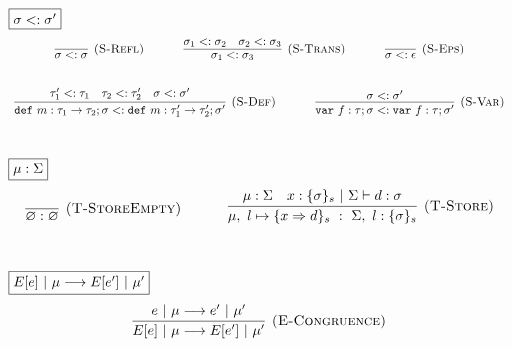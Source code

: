 \documentclass{llncs}
\newcommand{\keywadj}[1]{\mathtt{#1}}
\newcommand{\keyw}[1]{\keywadj{#1}~}
\begin{document}
$\fbox{$\sigma <: \sigma'$}$
\[
\begin{array}{c}
\infer[\textsc{(S-Refl)}]
  {\sigma <: \sigma}
  {}%
~~~~~~~~~~
\infer[\textsc{(S-Trans)}]
  {\sigma_1 <: \sigma_3}
  {\sigma_1 <: \sigma_2 & \sigma_2 <: \sigma_3}%
~~~~~~~~~~
\infer[\textsc{(S-Eps)}]
  {\sigma <: \epsilon}
  {}\\[5ex]

\infer[\textsc{(S-Def)}]
  {\keyw{def} m:\tau_1 \rightarrow \tau_2; \sigma <: \keyw{def} m:\tau_1' \rightarrow \tau_2'; \sigma'}
  {\tau_1' <: \tau_1 & \tau_2 <: \tau_2' & \sigma <: \sigma'}%
~~~~~~~~~~
\infer[\textsc{(S-Var)}]
  {\keyw{var} f:\tau; \sigma <: \keyw{var} f:\tau; \sigma'}
  {\sigma <: \sigma'}\\[5ex]  

\end{array}
\]

$\fbox{$\mu : \Sigma$}$
\[
\begin{array}{c}

\infer[\textsc{(T-StoreEmpty)}]
  {\varnothing : \varnothing}
  {}%
~~~~~~~~~~
\infer[\textsc{(T-Store)}]
  {\mu,~l \mapsto \{ x \Rightarrow d \}_s~:~\Sigma,~l : \{ \sigma \}_s}
  {\mu : \Sigma & x : \{ \sigma \}_s~|~\Sigma \vdash d : \sigma}\\[5ex]

\end{array}
\]

$\fbox{$E[e]~|~\mu \longrightarrow E[e']~|~\mu'$}$
\[
\begin{array}{c}
\infer[\textsc{(E-Congruence)}]
  {E[e]~|~\mu \longrightarrow E[e']~|~\mu'}
  {e~|~\mu \longrightarrow e'~|~\mu'}\\[5ex]  
\end{array}
\]
\end{document}
